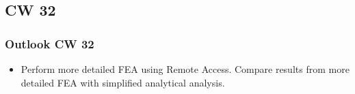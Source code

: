 \subsection{CW 32}
\begin{frame}
  \frametitle{Outlook CW 32}
	\begin{itemize}
		\item Perform more detailed FEA using Remote Access. Compare results from more detailed FEA with simplified analytical analysis.
	\end{itemize}
\end{frame}

